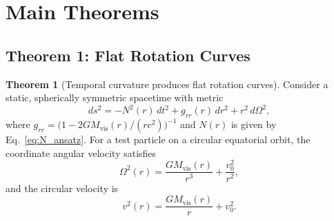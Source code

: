 \documentclass[11pt,a4paper]{article}
\theoremstyle{definition}
\newtheorem{theorem}{Theorem}[section]
\newcommand{\vis}{\mathrm{vis}}
\begin{document}
\section{Main Theorems}
\label{sec:main_theorems}

\subsection{Theorem 1: Flat Rotation Curves}

\begin{theorem}[Temporal curvature produces flat rotation curves]
\label{thm:rotation}
Consider a static, spherically symmetric spacetime with metric
\begin{equation}
    ds^2 = -N^2(r)\,dt^2 + g_{rr}(r)\,dr^2 + r^2\,d\Omega^2,
    \label{eq:static_metric}
\end{equation}
where $g_{rr} = \bigl(1 - 2GM_{\vis}(r)/(rc^2)\bigr)^{-1}$ and $N(r)$ is given by Eq.~\eqref{eq:N_ansatz}. For a test particle on a circular equatorial orbit, the coordinate angular velocity satisfies
\begin{equation}
    \Omega^2(r) = \frac{GM_{\vis}(r)}{r^3} + \frac{v_0^2}{r^2},
\end{equation}
and the circular velocity is
\begin{equation}
    \boxed{v^2(r) = \frac{GM_{\vis}(r)}{r} + v_0^2}.
\end{equation}
\end{theorem}
\end{document}

